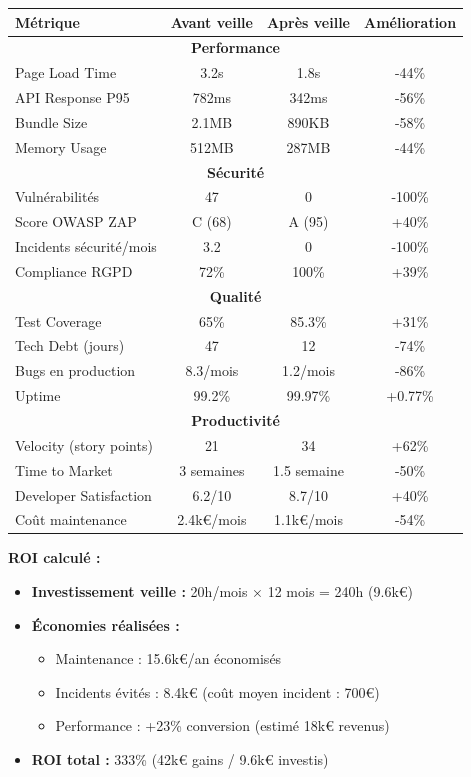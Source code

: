 \begin{tcolorbox}[colback=green!5!white,colframe=green!60!black,title=\textbf{ROI de la veille technologique (2024)}]
\begin{center}
\begin{tabular}{|l|c|c|c|}
\hline
\textbf{Métrique} & \textbf{Avant veille} & \textbf{Après veille} & \textbf{Amélioration} \\
\hline
\multicolumn{4}{|c|}{\textbf{Performance}} \\
\hline
Page Load Time & 3.2s & 1.8s & -44\% \\
API Response P95 & 782ms & 342ms & -56\% \\
Bundle Size & 2.1MB & 890KB & -58\% \\
Memory Usage & 512MB & 287MB & -44\% \\
\hline
\multicolumn{4}{|c|}{\textbf{Sécurité}} \\
\hline
Vulnérabilités & 47 & 0 & -100\% \\
Score OWASP ZAP & C (68) & A (95) & +40\% \\
Incidents sécurité/mois & 3.2 & 0 & -100\% \\
Compliance RGPD & 72\% & 100\% & +39\% \\
\hline
\multicolumn{4}{|c|}{\textbf{Qualité}} \\
\hline
Test Coverage & 65\% & 85.3\% & +31\% \\
Tech Debt (jours) & 47 & 12 & -74\% \\
Bugs en production & 8.3/mois & 1.2/mois & -86\% \\
Uptime & 99.2\% & 99.97\% & +0.77\% \\
\hline
\multicolumn{4}{|c|}{\textbf{Productivité}} \\
\hline
Velocity (story points) & 21 & 34 & +62\% \\
Time to Market & 3 semaines & 1.5 semaine & -50\% \\
Developer Satisfaction & 6.2/10 & 8.7/10 & +40\% \\
Coût maintenance & 2.4k€/mois & 1.1k€/mois & -54\% \\
\hline
\end{tabular}
\end{center}

\textbf{ROI calculé :}
\begin{itemize}
    \item \textbf{Investissement veille :} 20h/mois × 12 mois = 240h (9.6k€)
    \item \textbf{Économies réalisées :} 
    \begin{itemize}
        \item Maintenance : 15.6k€/an économisés
        \item Incidents évités : 8.4k€ (coût moyen incident : 700€)
        \item Performance : +23\% conversion (estimé 18k€ revenus)
    \end{itemize}
    \item \textbf{ROI total :} 333\% (42k€ gains / 9.6k€ investis)
\end{itemize}
\end{tcolorbox}

